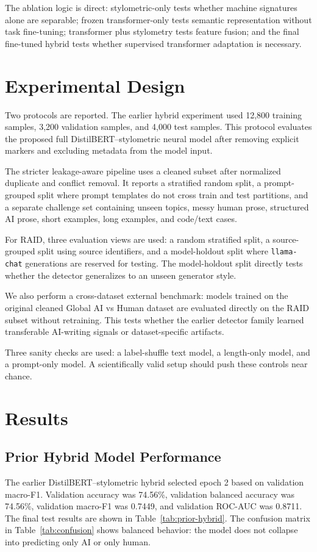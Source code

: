 \documentclass[conference]{IEEEtran}
\begin{document}
The ablation logic is direct: stylometric-only tests whether machine signatures alone are separable; frozen transformer-only tests semantic representation without task fine-tuning; transformer plus stylometry tests feature fusion; and the final fine-tuned hybrid tests whether supervised transformer adaptation is necessary.

\section{Experimental Design}
Two protocols are reported. The earlier hybrid experiment used 12,800 training samples, 3,200 validation samples, and 4,000 test samples. This protocol evaluates the proposed full DistilBERT--stylometric neural model after removing explicit markers and excluding metadata from the model input.

The stricter leakage-aware pipeline uses a cleaned subset after normalized duplicate and conflict removal. It reports a stratified random split, a prompt-grouped split where prompt templates do not cross train and test partitions, and a separate challenge set containing unseen topics, messy human prose, structured AI prose, short examples, long examples, and code/text cases.

For RAID, three evaluation views are used: a random stratified split, a source-grouped split using source identifiers, and a model-holdout split where \texttt{llama-chat} generations are reserved for testing. The model-holdout split directly tests whether the detector generalizes to an unseen generator style.

We also perform a cross-dataset external benchmark: models trained on the original cleaned Global AI vs Human dataset are evaluated directly on the RAID subset without retraining. This tests whether the earlier detector family learned transferable AI-writing signals or dataset-specific artifacts.

Three sanity checks are used: a label-shuffle text model, a length-only model, and a prompt-only model. A scientifically valid setup should push these controls near chance.

\section{Results}
\subsection{Prior Hybrid Model Performance}
The earlier DistilBERT--stylometric hybrid selected epoch 2 based on validation macro-F1. Validation accuracy was 74.56\%, validation balanced accuracy was 74.56\%, validation macro-F1 was 0.7449, and validation ROC-AUC was 0.8711. The final test results are shown in Table~\ref{tab:prior-hybrid}. The confusion matrix in Table~\ref{tab:confusion} shows balanced behavior: the model does not collapse into predicting only AI or only human.
\end{document}
